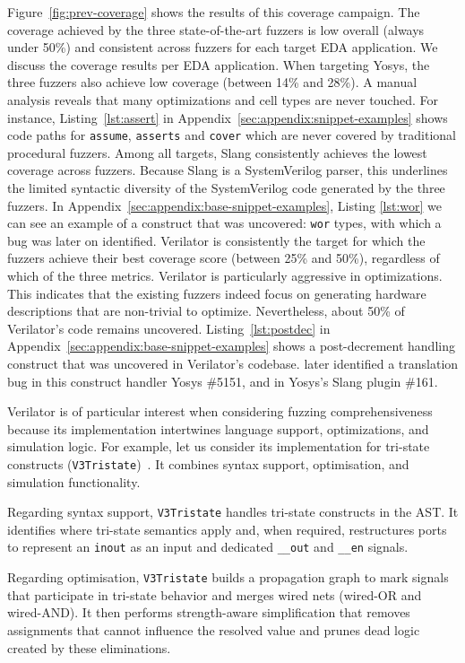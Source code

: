 Figure~\ref{fig:prev-coverage} shows the results of this coverage campaign.
The coverage achieved by the three state-of-the-art fuzzers is low overall (always under 50\%) and consistent across fuzzers for each target EDA application.
We discuss the coverage results per EDA application.
When targeting Yosys, the three fuzzers also achieve low coverage (between 14\% and 28\%).
A manual analysis reveals that many optimizations and cell types are never touched.
For instance, Listing~\ref{lst:assert} in Appendix~\ref{sec:appendix:snippet-examples} shows code paths for \texttt{assume}, \texttt{asserts} and \texttt{cover} which are never covered by traditional procedural fuzzers.
%
Among all targets, Slang consistently achieves the lowest coverage across fuzzers.
Because Slang is a SystemVerilog parser, this underlines the limited syntactic diversity of the SystemVerilog code generated by the three fuzzers.
In Appendix~\ref{sec:appendix:base-snippet-examples}, Listing \ref{lst:wor} we can see an example of a construct that was uncovered: \texttt{wor} types, with which a bug was later on identified.
%
Verilator is consistently the target for which the fuzzers achieve their best coverage score (between 25\% and 50\%), regardless of which of the three metrics.
Verilator is particularly aggressive in optimizations.
This indicates that the existing fuzzers indeed focus on generating hardware descriptions that are non-trivial to optimize.
Nevertheless, about 50\% of Verilator's code remains uncovered.
Listing~\ref{lst:postdec} in Appendix~\ref{sec:appendix:base-snippet-examples} shows a post-decrement handling construct that was uncovered in Verilator's codebase.
\ourname later identified a translation bug in this construct handler Yosys \#5151, and in Yosys's Slang plugin \#161.

Verilator is of particular interest when considering fuzzing comprehensiveness because its implementation intertwines language support, optimizations, and simulation logic.
For example, let us consider its implementation for tri-state constructs (\texttt{V3Tristate})~\cite{vanderlinden1994tristate}.
It combines syntax support, optimisation, and simulation functionality.

Regarding syntax support, \texttt{V3Tristate} handles tri-state constructs in the AST.
It identifies where tri-state semantics apply and, when required, restructures ports to represent an \texttt{inout} as an input and dedicated \texttt{\_\_out} and \texttt{\_\_en} signals.

Regarding optimisation, \texttt{V3Tristate} builds a propagation graph to mark signals that participate in tri-state behavior and merges wired nets (wired-OR and wired-AND).
It then performs strength-aware simplification that removes assignments that cannot influence the resolved value and prunes dead logic created by these eliminations.

